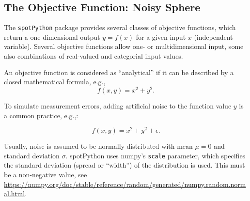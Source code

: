\documentclass[
  letterpaper,
  DIV=11,
  numbers=noendperiod]{scrreprt}
\begin{document}
\subsection{The Objective Function: Noisy
Sphere}\label{the-objective-function-noisy-sphere}

The \texttt{spotPython} package provides several classes of objective
functions, which return a one-dimensional output \(y=f(x)\) for a given
input \(x\) (independent variable). Several objective functions allow
one- or multidimensional input, some also combinations of real-valued
and categorial input values.

An objective function is considered as ``analytical'' if it can be
described by a closed mathematical formula, e.g., \[
f(x, y) = x^2 + y^2.
\]

To simulate measurement errors, adding artificial noise to the function
value \(y\) is a common practice, e.g.,:

\[
f(x, y) = x^2 + y^2 + \epsilon.
\]

Usually, noise is assumed to be normally distributed with mean \(\mu=0\)
and standard deviation \(\sigma\). spotPython uses numpy's
\texttt{scale} parameter, which specifies the standard deviation (spread
or ``width'') of the distribution is used. This must be a non-negative
value, see
\url{https://numpy.org/doc/stable/reference/random/generated/numpy.random.normal.html}.
\end{document}

